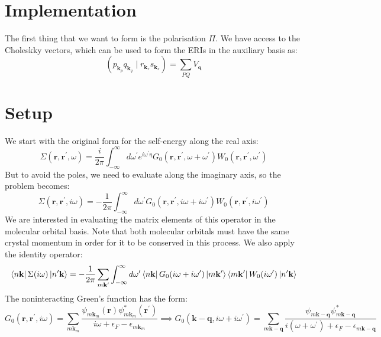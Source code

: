 \documentclass[12pt]{article}
\begin{document}
\section{Implementation}
The first thing that we want to form is the polarisation $\Pi$. We have access to the Choleskky vectors, which can be used to form the ERIs in the auxiliary basis as:
\begin{equation}
    (p_{\mathbf{k}_p} q_{\mathbf{k}_q} \mid r_{\mathbf{k}_r} s_{\mathbf{k}_s}) = \sum_{PQ} V_{\mathbf{q}}
\end{equation}
\section{Setup}
We start with the original form for the self-energy along the real axis:
\begin{equation}
\Sigma\left(\mathbf{r}, \mathbf{r}^{\prime}, \omega\right)=\frac{i}{2 \pi} \int_{-\infty}^{\infty} d \omega^{\prime} e^{i \omega^{\prime} \eta} G_{0}\left(\mathbf{r}, \mathbf{r}^{\prime}, \omega+\omega^{\prime}\right) W_{0}\left(\mathbf{r}, \mathbf{r}^{\prime}, \omega^{\prime}\right)
\end{equation}
But to avoid the poles, we need to evaluate along the imaginary axis, so the problem becomes:
\begin{equation*}
\Sigma\left(\mathbf{r}, \mathbf{r}^{\prime}, i \omega\right)=-\frac{1}{2 \pi} \int_{-\infty}^{\infty} d \omega^{\prime} G_{0}\left(\mathbf{r}, \mathbf{r}^{\prime}, i \omega+i \omega^{\prime}\right) W_{0}\left(\mathbf{r}, \mathbf{r}^{\prime}, i \omega^{\prime}\right) \tag{16}
\end{equation*}
We are interested in evaluating the matrix elements of this operator in the molecular orbital basis. Note that both molecular orbitals must have the same crystal momentum in order for it to be conserved in this process. We also apply the identity operator:
\begin{equation}
    \bra{n\mathbf{k}} \Sigma (i \omega) \ket{n^\prime\mathbf{k}} = -\frac{1}{2 \pi} \sum_{m\mathbf{k}^\prime}\int_{-\infty}^{\infty} d \omega^{\prime} \bra{n\mathbf{k}} G_0(i \omega + i \omega^{\prime}) \ket{m\mathbf{k^\prime}}\bra{m\mathbf{k^\prime}}W_0(i \omega^{\prime}) \ket{n^\prime\mathbf{k}}
\end{equation}
The noninteracting Green's function has the form:
\begin{equation*}
G_{0}\left(\mathbf{r}, \mathbf{r}^{\prime}, i \omega\right)=\sum_{m \mathbf{k}_{m}} \frac{\psi_{m \mathbf{k}_{m}}(\mathbf{r}) \psi_{m \mathbf{k}_{m}}^{*}\left(\mathbf{r^\prime}\right)}{i \omega+\epsilon_{F}-\epsilon_{m \mathbf{k}_{m}}} \implies G_{0}\left(\mathbf{k} - \mathbf{q}, i \omega + i \omega^{\prime}\right) = \sum_{m \mathbf{k}-\mathbf{q}} \frac{\psi_{m \mathbf{k}-\mathbf{q}} \psi_{m \mathbf{k}-\mathbf{q}}^{*}}{i \left(\omega + \omega^{\prime}\right) + \epsilon_{F} - \epsilon_{m \mathbf{k}-\mathbf{q}}}
\end{equation*}
\end{document}
